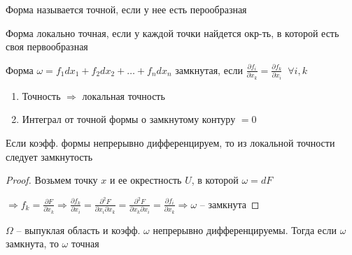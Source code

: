 
\begin{definition}\thmslashn
	
	Форма называется точной, если у нее есть перообразная
	
	Форма локально точная, если у каждой точки найдется окр-ть, в которой есть своя первообразная
	
	Форма $\omega = f_1 dx_1 + f_2dx_2 + \ldots + f_ndx_n$ замкнутая, если $\frac{\partial f_i}{\partial x_k} = \frac{\partial f_k}{\partial x_i} \;\;\forall i, k$
	
\end{definition}

\begin{remark}\thmslashn
	
	\begin{enumerate}
		\item 
		Точность $\Rightarrow$ локальная точность
		
		\item
		Интеграл от точной формы о замкнутому контуру $ = 0$
		
	\end{enumerate}
	
\end{remark}

\begin{theorem}\thmslashn

	Если коэфф. формы непрерывно дифференцируем, то из локальной точности следует замкнутость 

\end{theorem}

\begin{proof}\thmslashn
	
	Возьмем точку $x$ и ее окрестность $U$, в которой $\omega = dF$
	
	$\Rightarrow f_k = \frac{\partial F}{\partial x_k} \Rightarrow \frac{\partial f_k}{\partial x_i} = \frac{\partial^2 F}{\partial x_i\partial x_k} = \frac{\partial^2 F}{\partial x_k\partial x_i} = \frac{\partial f_i}{\partial x_k} \Rightarrow  \omega$  -- замкнута
	
\end{proof}

\begin{lemma}[Пуанкаре]\thmslashn
	
	$\Omega$ -- выпуклая область и коэфф. $\omega$ непрерывно дифференцируемы. Тогда если $\omega$ замкнута, то $\omega$ точная
	
\end{lemma}

